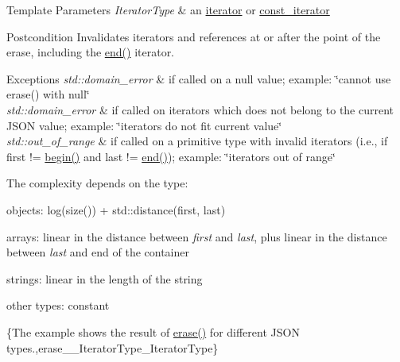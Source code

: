 \begin{DoxyTemplParams}{Template Parameters}
{\em Iterator\+Type} & an \hyperlink{classnlohmann_1_1basic__json_ae3c77a8f03096da2a32a3de0c317d445}{iterator} or \hyperlink{classnlohmann_1_1basic__json_a2b53a089e945e75deaac6782aa942a77}{const\+\_\+iterator}\\
\hline
\end{DoxyTemplParams}
\begin{DoxyPostcond}{Postcondition}
Invalidates iterators and references at or after the point of the erase, including the {\ttfamily \hyperlink{classnlohmann_1_1basic__json_a12ccf14d39ddae52f6c7e126105a230b}{end()}} iterator.
\end{DoxyPostcond}

\begin{DoxyExceptions}{Exceptions}
{\em std\+::domain\+\_\+error} & if called on a {\ttfamily null} value; example\+: {\ttfamily \char`\"{}cannot
use erase() with null\char`\"{}} \\
\hline
{\em std\+::domain\+\_\+error} & if called on iterators which does not belong to the current J\+S\+O\+N value; example\+: {\ttfamily \char`\"{}iterators do not fit current value\char`\"{}} \\
\hline
{\em std\+::out\+\_\+of\+\_\+range} & if called on a primitive type with invalid iterators (i.\+e., if {\ttfamily first != \hyperlink{classnlohmann_1_1basic__json_ad4e381c54039607be08d7af41a1f6ad1}{begin()}} and {\ttfamily last != \hyperlink{classnlohmann_1_1basic__json_a12ccf14d39ddae52f6c7e126105a230b}{end()}}); example\+: {\ttfamily \char`\"{}iterators out of range\char`\"{}}\\
\hline
\end{DoxyExceptions}
The complexity depends on the type\+:
\begin{DoxyItemize}
\item objects\+: {\ttfamily log(size()) + std\+::distance(first, last)}
\item arrays\+: linear in the distance between {\itshape first} and {\itshape last}, plus linear in the distance between {\itshape last} and end of the container
\item strings\+: linear in the length of the string
\item other types\+: constant
\end{DoxyItemize}

\{The example shows the result of {\ttfamily \hyperlink{classnlohmann_1_1basic__json_ab9f8c9a02d6bb794ee26801a232ca4f4}{erase()}} for different J\+S\+O\+N types.,erase\+\_\+\+\_\+\+Iterator\+Type\+\_\+\+Iterator\+Type\}

